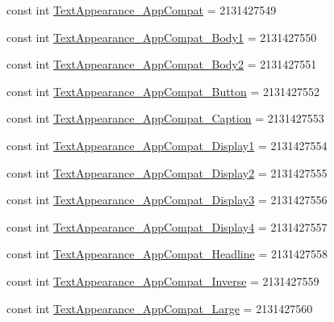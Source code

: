 \begin{DoxyCompactItemize}
\item 
const int \mbox{\hyperlink{class_f_w_p_s___app_1_1_droid_1_1_resource_1_1_style_ab4b023bb57fad47e5b5fb115b4073804}{Text\+Appearance\+\_\+\+App\+Compat}} = 2131427549
\item 
const int \mbox{\hyperlink{class_f_w_p_s___app_1_1_droid_1_1_resource_1_1_style_ad748d75aad80c2390ef93f19ac7a7e3b}{Text\+Appearance\+\_\+\+App\+Compat\+\_\+\+Body1}} = 2131427550
\item 
const int \mbox{\hyperlink{class_f_w_p_s___app_1_1_droid_1_1_resource_1_1_style_a8ebf99bd8ee8ff9c127bcc2451370fb1}{Text\+Appearance\+\_\+\+App\+Compat\+\_\+\+Body2}} = 2131427551
\item 
const int \mbox{\hyperlink{class_f_w_p_s___app_1_1_droid_1_1_resource_1_1_style_aaa6aedaa82ffa1d37809632128763076}{Text\+Appearance\+\_\+\+App\+Compat\+\_\+\+Button}} = 2131427552
\item 
const int \mbox{\hyperlink{class_f_w_p_s___app_1_1_droid_1_1_resource_1_1_style_ab142c1334bfdedbf9fa46a8cc9845399}{Text\+Appearance\+\_\+\+App\+Compat\+\_\+\+Caption}} = 2131427553
\item 
const int \mbox{\hyperlink{class_f_w_p_s___app_1_1_droid_1_1_resource_1_1_style_a0983fbea07249289298db92367730164}{Text\+Appearance\+\_\+\+App\+Compat\+\_\+\+Display1}} = 2131427554
\item 
const int \mbox{\hyperlink{class_f_w_p_s___app_1_1_droid_1_1_resource_1_1_style_ad3dd68cb86d66985a8d64e13c7909118}{Text\+Appearance\+\_\+\+App\+Compat\+\_\+\+Display2}} = 2131427555
\item 
const int \mbox{\hyperlink{class_f_w_p_s___app_1_1_droid_1_1_resource_1_1_style_a0313f694ca1ead32d2a8a1c73e9f01fd}{Text\+Appearance\+\_\+\+App\+Compat\+\_\+\+Display3}} = 2131427556
\item 
const int \mbox{\hyperlink{class_f_w_p_s___app_1_1_droid_1_1_resource_1_1_style_a298378de93484ab7ca612c421f5b4a21}{Text\+Appearance\+\_\+\+App\+Compat\+\_\+\+Display4}} = 2131427557
\item 
const int \mbox{\hyperlink{class_f_w_p_s___app_1_1_droid_1_1_resource_1_1_style_abd5d1555770afb5cf941eed8aec39a4f}{Text\+Appearance\+\_\+\+App\+Compat\+\_\+\+Headline}} = 2131427558
\item 
const int \mbox{\hyperlink{class_f_w_p_s___app_1_1_droid_1_1_resource_1_1_style_a311f1864484bea2b5063af6e42b0c351}{Text\+Appearance\+\_\+\+App\+Compat\+\_\+\+Inverse}} = 2131427559
\item 
const int \mbox{\hyperlink{class_f_w_p_s___app_1_1_droid_1_1_resource_1_1_style_aa8eb743ccfed2dc5a56b75c6b26830b9}{Text\+Appearance\+\_\+\+App\+Compat\+\_\+\+Large}} = 2131427560

\end{DoxyCompactItemize}
